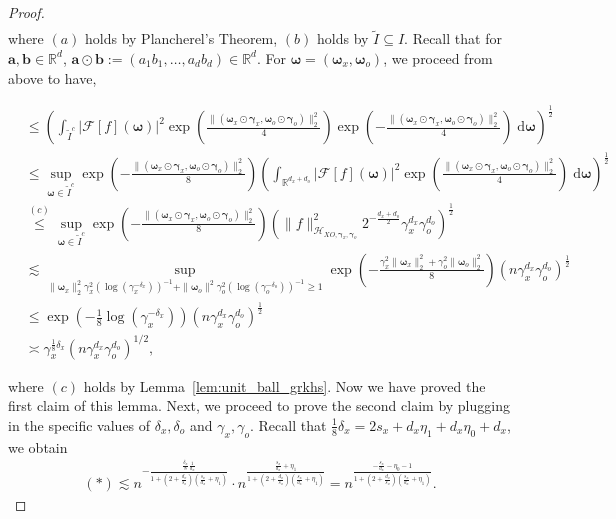 \documentclass[11pt]{article}
\newcommand{\bgamma}{\boldsymbol{\gamma}}
\newcommand{\ba}{\mathbf{a}}
\newcommand{\bomega}{\boldsymbol{\omega}}
\newcommand{\calF}{\mathcal{F}}
\newcommand{\calH}{\mathcal{H}}
\newcommand{\R}{\mathbb{R}}
\newcommand{\0}{\mathbf{0}}
\begin{document}
\begin{appendix}
\begin{proof}
\begin{align*}
\end{align*}
where $(a)$ holds by Plancherel's Theorem, $(b)$ holds by $\tilde{I}\subseteq I$. 
Recall that for $\ba, \mathbf{b}\in\R^d$, $\ba \odot \mathbf{b} := (a_1 b_1, \ldots, a_d b_d) \in \R^{d}$. For $\bomega=(\bomega_x, \bomega_o)$, we proceed from above to have,
\begin{small}
\begin{align*}
    &\leq \left(\int_{\tilde{I}^{c}} |\calF[f](\bomega)|^2 \exp\left(\frac{\|(\bomega_x \odot \bgamma_x, \bomega_o \odot \bgamma_o )\|^2_{2}}{4}\right)\exp\left(-\frac{\|(\bomega_x \odot \bgamma_x, \bomega_o \odot \bgamma_o ) \|^2_{2}}{4}\right)\;\mathrm{d}\bomega\right)^{\frac{1}{2}}\\
    &\leq \sup_{\bomega\in \tilde{I}^{c}}\exp\left(-\frac{\|(\bomega_x \odot \bgamma_x, \bomega_o \odot \bgamma_o )\|^2_{2}}{8}\right)\left(\int_{\R^{d_x+d_o}} |\calF[f](\bomega)|^2 \exp\left(\frac{\|(\bomega_x \odot \bgamma_x, \bomega_o \odot \bgamma_o ) \|^2_{2}}{4}\right)\;\mathrm{d}\bomega\right)^{\frac{1}{2}}\\
    &\stackrel{(c)}{\leq} \sup_{\bomega\in \tilde{I}^{c}}\exp\left(-\frac{\|(\bomega_x \odot \bgamma_x, \bomega_o \odot \bgamma_o ) \|^2_{2}}{8}\right)\left( \|f\|_{\calH_{XO,\bgamma_x,\bgamma_o}}^2 2^{-\frac{d_x+d_o}{2}} \gamma_x^{d_x}\gamma_o^{d_o}\right)^{\frac{1}{2}}\\
    &\lesssim \sup_{\|\bomega_x\|_2^2 \gamma_x^{2} (\log (\gamma_x^{-\delta_x}))^{-1} + \|\bomega_{o}\|^2\gamma_o^{2} (\log (\gamma_o^{-\delta_o}))^{-1} \geq 1} \exp\left(-\frac{ \gamma_x^2 \|\bomega_x\|_2^2 + \gamma_o^2 \|\bomega_o\|_2^2 }{8}\right)\left(n  \gamma_x^{d_x}\gamma_o^{d_o}\right)^{\frac{1}{2}} \\
    &\leq \exp\left(-\frac{1}{8} \log(\gamma_x^{-\delta_x} ) \right)\left(n \gamma_x^{d_x} \gamma_o^{d_o}\right)^{\frac{1}{2}} \\
    &\asymp \gamma_x^{\frac{1}{8} \delta_x} \left(n \gamma_x^{d_x}\gamma_o^{d_o} \right)^{1/2},
\end{align*}
\end{small}
where $(c)$ holds by Lemma~\ref{lem:unit_ball_grkhs}.
Now we have proved the first claim of this lemma. Next, we proceed to prove the second claim by plugging in the specific values of $\delta_x,\delta_o$ and $\gamma_x,\gamma_o$. 
Recall that $\frac{1}{8} \delta_x = 2s_x + d_x\eta_1 + d_x \eta_0 + d_x$, we obtain 
\begin{align*}
    (\ast) \lesssim  n^{-\frac{\frac{\delta_x}{8}\frac{1}{d_x}}{1+(2+\frac{d_o}{s_o})(\frac{s_x}{d_x}+\eta_1)}} \cdot n^{\frac{\frac{s_x}{d_x}+\eta_1}{1+(2+\frac{d_o}{s_o})(\frac{s_x}{d_x}+\eta_1)}} = n^{\frac{-\frac{s_x}{d_x} - \eta_0 - 1}{1+(2+\frac{d_o}{s_o})(\frac{s_x}{d_x}+\eta_1)}} .

\end{align*}
\end{proof}
\end{appendix}
\end{document}
